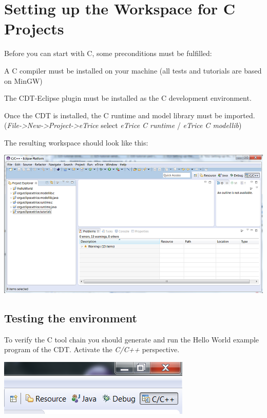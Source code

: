 \chapter{Setting up the Workspace for C Projects}
 
Before you can start with C, some preconditions must be fulfilled:

\begin{description}
\item{A C compiler} must be installed on your machine (all tests and tutorials are based on MinGW)
\item{The CDT-Eclipse plugin} must be installed as the C development environment.
\end{description}

Once the CDT is installed, the C runtime and model library must be imported. 
(\textit{File->New->Project->eTrice} select \textit{eTrice C runtime} / \textit{eTrice C modellib})

The resulting workspace should look like this:

\includegraphics{images/032-SetupWorkspaceC01.png}


\section{Testing the environment}

To verify the C tool chain you should generate and run the Hello World example program of the CDT. 
Activate the \textit{C/C++} perspective. 

\includegraphics{images/032-SetupWorkspaceC03.png} 
 
